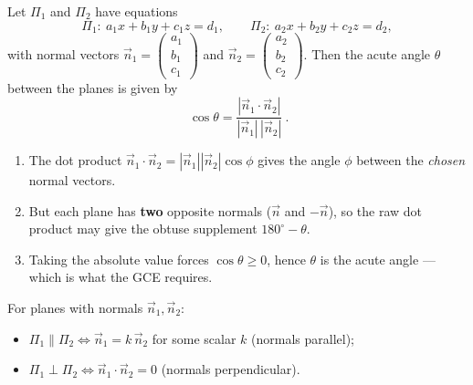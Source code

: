 \documentclass[11pt]{article}
\begin{document}
\begin{propriete}
Let $\Pi_1$ and $\Pi_2$ have equations
\[
\Pi_1:\ a_1x+b_1y+c_1z=d_1, \qquad \Pi_2:\ a_2x+b_2y+c_2z=d_2,
\]
with normal vectors $\vec{n}_1=\begin{pmatrix}a_1\\b_1\\c_1\end{pmatrix}$ and $\vec{n}_2=\begin{pmatrix}a_2\\b_2\\c_2\end{pmatrix}$. Then the acute angle $\theta$ between the planes is given by
\[
\boxed{\ \cos\theta=\dfrac{|\vec{n}_1\cdot\vec{n}_2|}{|\vec{n}_1|\,|\vec{n}_2|}\ }.
\]
\end{propriete}

\begin{methode}
\begin{enumerate}
\item The dot product $\vec{n}_1\cdot\vec{n}_2=|\vec{n}_1||\vec{n}_2|\cos\phi$ gives the angle $\phi$ between the \emph{chosen} normal vectors.
\item But each plane has \textbf{two} opposite normals ($\vec{n}$ and $-\vec{n}$), so the raw dot product may give the obtuse supplement $180^\circ-\theta$.
\item Taking the absolute value forces $\cos\theta\ge 0$, hence $\theta$ is the acute angle — which is what the GCE requires.
\end{enumerate}
\end{methode}

\begin{propriete}
For planes with normals $\vec{n}_1,\vec{n}_2$:
\begin{itemize}
\item $\Pi_1 \parallel \Pi_2 \iff \vec{n}_1 = k\,\vec{n}_2$ for some scalar $k$ (normals parallel);
\item $\Pi_1 \perp \Pi_2 \iff \vec{n}_1\cdot\vec{n}_2 = 0$ (normals perpendicular).
\end{itemize}
\end{propriete}
\end{document}
